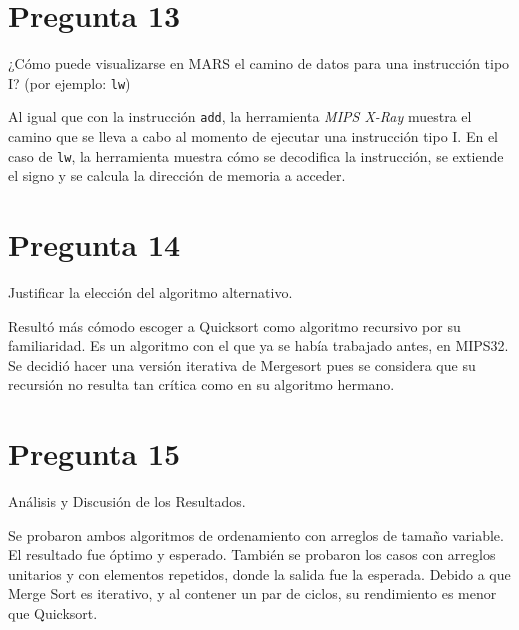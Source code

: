 \documentclass[12pt]{article}
\begin{document}
\section*{Pregunta 13}
¿Cómo puede visualizarse en MARS el camino de datos para una instrucción tipo I? (por ejemplo: \texttt{lw})

Al igual que con la instrucción \texttt{add}, la herramienta \textit{MIPS X-Ray} muestra el camino que se lleva a cabo al momento de ejecutar una instrucción tipo I. En el caso de \texttt{lw}, la herramienta muestra cómo se decodifica la instrucción, se extiende el signo y se calcula la dirección de memoria a acceder.

\section*{Pregunta 14}
Justificar la elección del algoritmo alternativo.

Resultó más cómodo escoger a Quicksort como algoritmo recursivo por su familiaridad. Es un algoritmo con el que ya se había trabajado antes, en MIPS32. Se decidió hacer una versión iterativa de Mergesort pues se considera que su recursión no resulta tan crítica como en su algoritmo hermano.

\section*{Pregunta 15}
Análisis y Discusión de los Resultados.

Se probaron ambos algoritmos de ordenamiento con arreglos de tamaño variable. El resultado fue óptimo y esperado. También se probaron los casos con arreglos unitarios y con elementos repetidos, donde la salida fue la esperada. Debido a que Merge Sort es iterativo, y al contener un par de ciclos, su rendimiento es menor que Quicksort.
\end{document}
